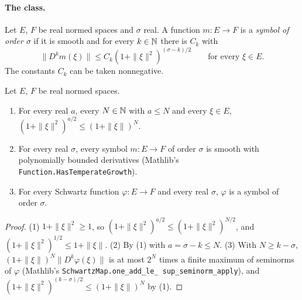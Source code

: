 \paragraph{The class.}

\begin{definition}
\label{def:symbol-growth}
\leanok
Let $E$, $F$ be real normed spaces and $\sigma$ real. A function $m \colon E \to F$ is a
\emph{symbol of order $\sigma$} if it is smooth and for every $k \in \mathbb{N}$ there is $C_k$ with
\[
  \|D^k m(\xi)\| \leq C_k (1 + \|\xi\|^2)^{(\sigma - k)/2} \qquad \text{for every } \xi \in E .
\]
The constants $C_k$ can be taken nonnegative.
\end{definition}

\begin{lemma}
\label{lem:symbol-temperate-schwartz}
\leanok
{}
Let $E$, $F$ be real normed spaces.
\begin{enumerate}
  \item For every real $a$, every $N \in \mathbb{N}$ with $a \leq N$ and every $\xi \in E$,
    $(1 + \|\xi\|^2)^{a/2} \leq (1 + \|\xi\|)^N$.
  \item For every real $\sigma$, every symbol $m \colon E \to F$ of order $\sigma$ is smooth
    with polynomially bounded derivatives (Mathlib's
    \texttt{Function.\allowbreak HasTemperateGrowth}).
  \item For every Schwartz function $\varphi \colon E \to F$ and every real $\sigma$, $\varphi$
    is a symbol of order $\sigma$.
\end{enumerate}
\end{lemma}

\begin{proof}
\leanok
(1) $1 + \|\xi\|^2 \geq 1$, so $(1 + \|\xi\|^2)^{a/2} \leq (1 + \|\xi\|^2)^{N/2}$, and
$(1 + \|\xi\|^2)^{1/2} \leq 1 + \|\xi\|$. (2) By (1) with $a = \sigma - k \leq N$.
(3) With $N \geq k - \sigma$, $(1 + \|\xi\|)^N \|D^k \varphi(\xi)\|$ is at most $2^N$ times a
finite maximum of seminorms of $\varphi$ (Mathlib's
\texttt{SchwartzMap.\allowbreak one\_\allowbreak add\_\allowbreak le\_\allowbreak
sup\_\allowbreak seminorm\_\allowbreak apply}), and
$(1 + \|\xi\|^2)^{(k - \sigma)/2} \leq (1 + \|\xi\|)^N$ by (1).
\end{proof}

